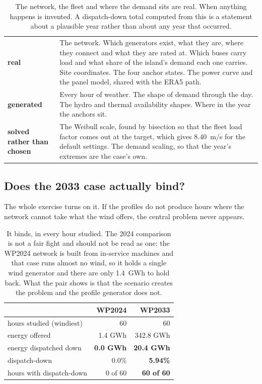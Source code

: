 \documentclass[11pt,a4paper]{article}
\begin{document}
\begin{table}[H]\centering\small
\begin{tabularx}{\textwidth}{lX}
\toprule
\textbf{real} & The network. Which generators exist, what they are, where they
connect and what they are rated at. Which buses carry load and what share of
the island's demand each one carries. Site coordinates. The four anchor states.
The power curve and the panel model, shared with the ERA5 path. \\
\addlinespace
\textbf{generated} & Every hour of weather. The shape of demand through the
day. The hydro and thermal availability shapes. Where in the year the anchors
sit. \\
\addlinespace
\textbf{solved rather than chosen} & The Weibull scale, found by bisection so
that the fleet load factor comes out at the target, which gives 8.40~m/s for
the default settings. The demand scaling, so that the year's extremes are the
case's own. \\
\bottomrule
\end{tabularx}
\caption{The network, the fleet and where the demand sits are real. When
anything happens is invented. A dispatch-down total computed from this is a
statement about a plausible year rather than about any year that occurred.}
\end{table}

\subsection{Does the 2033 case actually bind?}

The whole exercise turns on it. If the profiles do not produce hours where the
network cannot take what the wind offers, the central problem never appears.

\begin{table}[H]\centering\small
\begin{tabular}{lrr}
\toprule
& \textbf{WP2024} & \textbf{WP2033} \\
\midrule
hours studied (windiest) & 60 & 60 \\
energy offered   & 1.4 GWh & 342.8 GWh \\
energy dispatched down & \textbf{0.0 GWh} & \textbf{20.4 GWh} \\
dispatch-down    & 0.0\% & \textbf{5.94\%} \\
hours with dispatch-down & 0 of 60 & \textbf{60 of 60} \\
\bottomrule
\end{tabular}
\caption{It binds, in every hour studied. The 2024 comparison is not a fair
fight and should not be read as one: the WP2024 network is built from
in-service machines and that case runs almost no wind, so it holds a single
wind generator and there are only 1.4~GWh to hold back. What the pair shows is
that the scenario creates the problem and the profile generator does not.}
\end{table}
\end{document}
